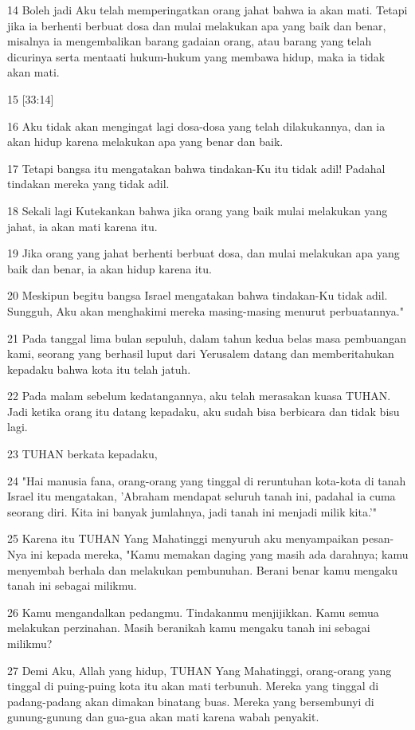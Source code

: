 \par 14 Boleh jadi Aku telah memperingatkan orang jahat bahwa ia akan mati. Tetapi jika ia berhenti berbuat dosa dan mulai melakukan apa yang baik dan benar, misalnya ia mengembalikan barang gadaian orang, atau barang yang telah dicurinya serta mentaati hukum-hukum yang membawa hidup, maka ia tidak akan mati.
\par 15 [33:14]
\par 16 Aku tidak akan mengingat lagi dosa-dosa yang telah dilakukannya, dan ia akan hidup karena melakukan apa yang benar dan baik.
\par 17 Tetapi bangsa itu mengatakan bahwa tindakan-Ku itu tidak adil! Padahal tindakan mereka yang tidak adil.
\par 18 Sekali lagi Kutekankan bahwa jika orang yang baik mulai melakukan yang jahat, ia akan mati karena itu.
\par 19 Jika orang yang jahat berhenti berbuat dosa, dan mulai melakukan apa yang baik dan benar, ia akan hidup karena itu.
\par 20 Meskipun begitu bangsa Israel mengatakan bahwa tindakan-Ku tidak adil. Sungguh, Aku akan menghakimi mereka masing-masing menurut perbuatannya."
\par 21 Pada tanggal lima bulan sepuluh, dalam tahun kedua belas masa pembuangan kami, seorang yang berhasil luput dari Yerusalem datang dan memberitahukan kepadaku bahwa kota itu telah jatuh.
\par 22 Pada malam sebelum kedatangannya, aku telah merasakan kuasa TUHAN. Jadi ketika orang itu datang kepadaku, aku sudah bisa berbicara dan tidak bisu lagi.
\par 23 TUHAN berkata kepadaku,
\par 24 "Hai manusia fana, orang-orang yang tinggal di reruntuhan kota-kota di tanah Israel itu mengatakan, 'Abraham mendapat seluruh tanah ini, padahal ia cuma seorang diri. Kita ini banyak jumlahnya, jadi tanah ini menjadi milik kita.'"
\par 25 Karena itu TUHAN Yang Mahatinggi menyuruh aku menyampaikan pesan-Nya ini kepada mereka, "Kamu memakan daging yang masih ada darahnya; kamu menyembah berhala dan melakukan pembunuhan. Berani benar kamu mengaku tanah ini sebagai milikmu.
\par 26 Kamu mengandalkan pedangmu. Tindakanmu menjijikkan. Kamu semua melakukan perzinahan. Masih beranikah kamu mengaku tanah ini sebagai milikmu?
\par 27 Demi Aku, Allah yang hidup, TUHAN Yang Mahatinggi, orang-orang yang tinggal di puing-puing kota itu akan mati terbunuh. Mereka yang tinggal di padang-padang akan dimakan binatang buas. Mereka yang bersembunyi di gunung-gunung dan gua-gua akan mati karena wabah penyakit.
